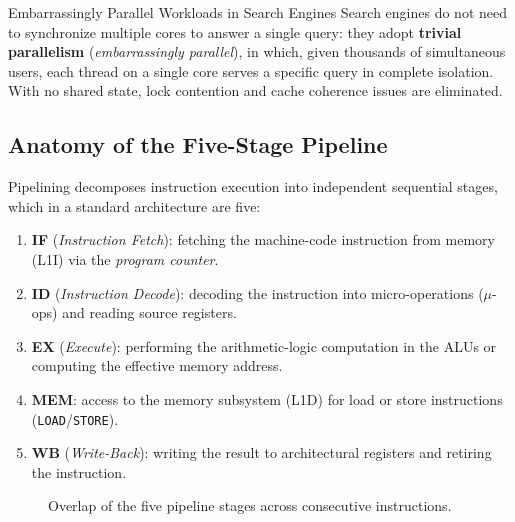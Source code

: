 \begin{noteblock}{Embarrassingly Parallel Workloads in Search Engines}
Search engines do not need to synchronize multiple cores to answer a single query: they adopt \textbf{trivial parallelism} (\textit{embarrassingly parallel}), in which, given thousands of simultaneous users, each thread on a single core serves a specific query in complete isolation. With no shared state, lock contention and cache coherence issues are eliminated.
\end{noteblock}

\subsection{Anatomy of the Five-Stage Pipeline}

Pipelining decomposes instruction execution into independent sequential stages, which in a standard architecture are five:

\begin{enumerate}
    \item \textbf{IF} (\textit{Instruction Fetch}): fetching the machine-code instruction from memory (L1I) via the \textit{program counter}.
    \item \textbf{ID} (\textit{Instruction Decode}): decoding the instruction into micro-operations ($\mu$-ops) and reading source registers.
    \item \textbf{EX} (\textit{Execute}): performing the arithmetic-logic computation in the ALUs or computing the effective memory address.
    \item \textbf{MEM}: access to the memory subsystem (L1D) for load or store instructions (\texttt{LOAD}/\texttt{STORE}).
    \item \textbf{WB} (\textit{Write-Back}): writing the result to architectural registers and retiring the instruction.
\end{enumerate}

\begin{figure}[htbp]
\centering
{}
\caption{Overlap of the five pipeline stages across consecutive instructions.}
\label{fig:pipeline-5-stadi-en}
\end{figure}

